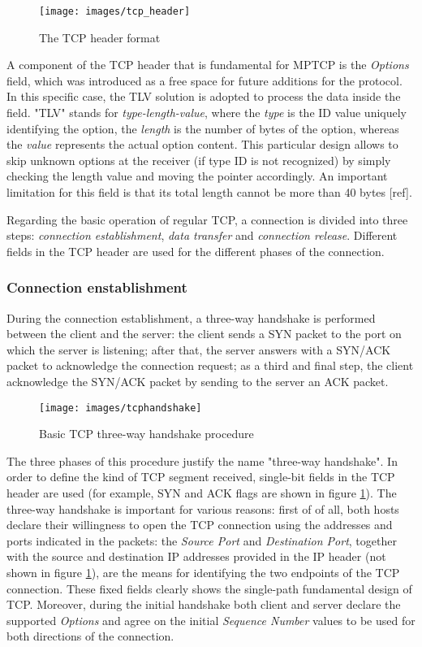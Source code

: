 \begin{figure}[!htb]
\centering
\texttt{[image: images/tcp\_header]}
\caption{The TCP header format}
\label{fig:tcp_header}
\end{figure}

A component of the TCP header that is fundamental for MPTCP is the \textit{Options} field, which was introduced as a free space for future additions for the protocol. In this specific case, the TLV solution is adopted to process the data inside the field. "TLV" stands for \textit{type-length-value}, where the \textit{type} is the ID value uniquely identifying the option, the \textit{length} is the number of bytes of the option, whereas the \textit{value} represents the actual option content. This particular design allows to skip unknown options at the receiver (if type ID is not recognized) by simply checking the length value and moving the pointer accordingly. An important limitation for this field is that its total length cannot be more than 40 bytes [ref].

Regarding the basic operation of regular TCP, a connection is divided into three steps: \textit{connection establishment}, \textit{data transfer} and \textit{connection release}. Different fields in the TCP header are used for the different phases of the connection.

\subsubsection{Connection enstablishment}
During the connection establishment, a  three-way handshake is performed between the client and the server: the client sends a SYN packet to the port on which the server is listening; after that, the server answers with a SYN/ACK packet to acknowledge the connection request; as a third and final step, the client acknowledge the SYN/ACK packet by sending to the server an ACK packet. 

\begin{figure}[!htb]
\centering
\texttt{[image: images/tcphandshake]}
\caption{Basic TCP three-way handshake procedure}
\label{fig:tcphandshake}
\end{figure}

The three phases of this procedure justify the name "three-way handshake". In order to define the kind of TCP segment received, single-bit fields in the TCP header are used (for example, SYN and ACK flags are shown in figure \ref{fig:tcp_header}). 
The three-way handshake is important for various reasons: first of of all, both hosts declare their willingness to open the TCP connection using the addresses and ports indicated in the packets: the \textit{Source Port} and \textit{Destination Port}, together with the source and destination IP addresses provided in the IP header (not shown in figure \ref{fig:tcp_header}), are the means for identifying the two endpoints of the TCP connection. These fixed fields clearly shows the single-path fundamental design of TCP. 
Moreover, during the initial handshake both client and server declare the supported \textit{Options} and agree on the initial \textit{Sequence Number} values to be used for both directions of the connection.

